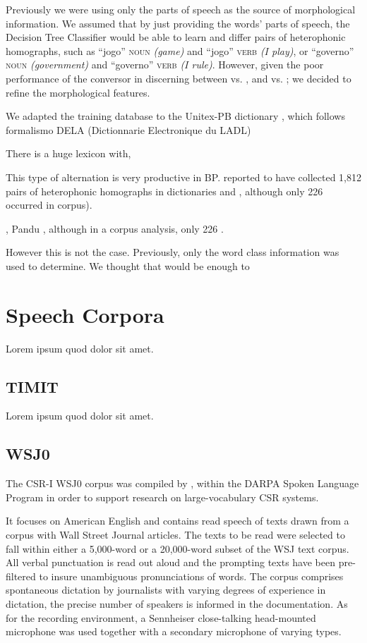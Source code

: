 Previously we were using only the parts of speech as the source of morphological information. We assumed that by just providing the words' parts of speech, the Decision Tree Classifier would be able to learn and differ pairs of heterophonic homographs, such as ``jogo'' \textsc{noun} \emph{(game)} and ``jogo'' \textsc{verb} \emph{(I play)}, or ``governo'' \textsc{noun} \emph{(government)} and ``governo'' \textsc{verb} \emph{(I rule)}. However, given the poor performance of the conversor in discerning between \textipa{[E]} vs. \textipa{[e]}, and \textipa{[O]} vs. \textipa{[o]}; we decided to refine the morphological features. 

We adapted the training database to the Unitex-PB dictionary \cite{Muniz2004}, which follows  formalismo DELA (Dictionnarie Electronique du LADL)

There is a huge lexicon with,

This type of alternation is very productive in \ac{BP}.  reported to have collected 1,812 pairs of heterophonic homographs in dictionaries and , although only 226 occurred in corpus).

\citeauthor{}, Pandu , although in a corpus analysis, only 226 \cite{Shulby2013}.

However this is not the case. Previously, only the word class information was used to determine. We thought that would be enough to 

\section{Speech Corpora}
Lorem ipsum quod dolor sit amet.

\subsection{TIMIT}
Lorem ipsum quod dolor sit amet.

\subsection{WSJ0}
The CSR-I WSJ0 corpus was compiled by \citeauthor{Garofolo1993} \cite{Garofolo1993}, within the 
DARPA Spoken Language Program in order to support research on large-vocabulary \ac{CSR} systems.

It focuses on American English and contains read speech of texts drawn from a corpus with Wall 
Street Journal articles. The texts to be read were selected to fall within either a 5,000-word or 
a 20,000-word subset of the WSJ text corpus. All verbal punctuation is read out aloud and the 
prompting texts have been pre-filtered to insure unambiguous pronunciations of words. The corpus 
comprises spontaneous dictation by journalists with varying degrees of experience in dictation, 
the precise number of speakers is informed in the documentation. As for the recording environment, 
a Sennheiser close-talking head-mounted microphone was used together with a secondary microphone of 
varying types.  

